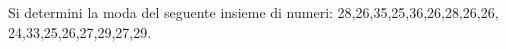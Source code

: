 Si determini la moda del seguente insieme di numeri: 
28,26,35,25,36,26,28,26,26,
24,33,25,26,27,29,27,29.
